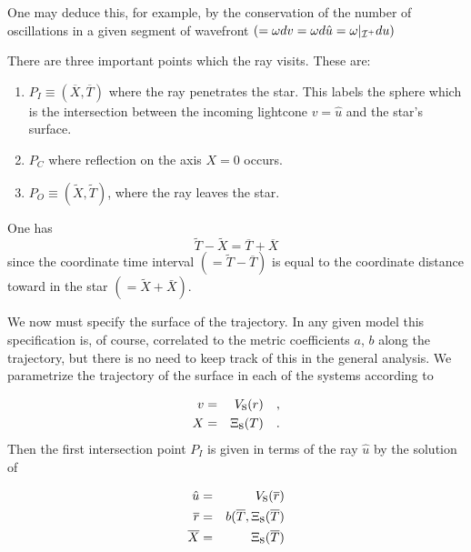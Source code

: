 \documentclass[12pt,oneside]{report}
\def\beq {\begin{equation}}
\def\feq {\end{equation}}
\begin{document}
\noindent  One may deduce this, for example, by the
conservation of the number of oscillations in a given segment
of wavefront $( =  \omega d v = \omega d {\hat u} =
\omega \vert_{{\cal I}^+} d u)$


There are three important points which the ray visits. These
are:

\begin{enumerate}
\item $P_I\equiv ({\overline X},{\overline T})$ where the ray penetrates the
star. This labels the sphere which is the intersection between
the incoming lightcone $ v = \hat u$ and the star's surface.
\item $P_C$ where reflection on the axis $X = 0$ occurs.
\item $P_O\equiv ({\tilde X}, {\tilde T})$, where the ray leaves the
star.
\end{enumerate}

\noindent One has
\beq {\tilde T} - {\tilde X} = {\overline T} + {\overline X} \label{AHwrad4} \feq
\noindent since the coordinate time interval $ (= {\tilde T}
- {\overline T}) $ is equal to the coordinate distance toward
in the star $ (= {\tilde X} + {\bar X}) $.


We now must specify the surface of the trajectory. In any
given model this specification is, of course, correlated to
the metric coefficients $a$, $b$ along the trajectory, but there
is no need to keep track of this in the general analysis. We
parametrize the trajectory of the surface in each of the
systems according to

\begin{eqnarray}
v &=& V_{\mbox{\rm s}} (r)\quad ,  \nonumber \\
X &=& \Xi_{\mbox{\rm s}} (T)\quad .  \label{AHwrad5}
\end{eqnarray}
\noindent Then the first intersection point $P_I$ is given in terms
of the ray $ {\hat u}$ by the solution of

\begin{eqnarray}
{\hat u} &=& V_{\mbox{\rm s}} ({\overline r})\nonumber \\
{\overline r} &=& b ( {\overline T}, \Xi_{\mbox{\rm s}} ({\overline
T}) \nonumber \\
{\overline X} &=& \Xi_{\mbox{\rm s}} ({\overline T}) \label{AHwrad6}
\end{eqnarray}
\end{document}
